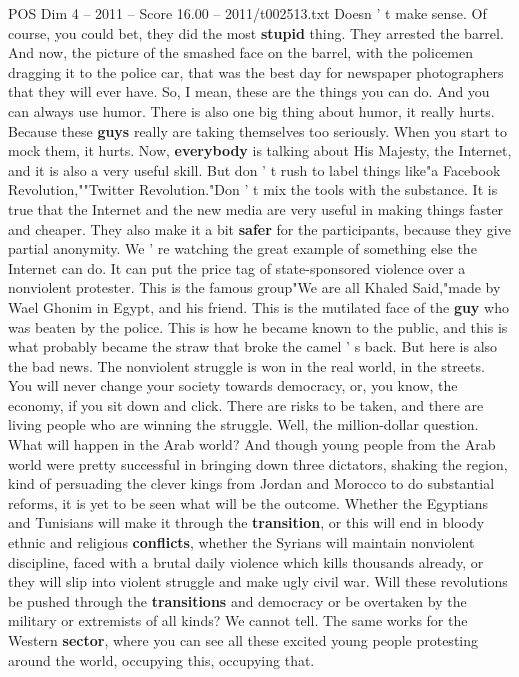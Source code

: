 \begin{textsample}{POS Dim 4 – 2011 – Score 16.00 – 2011/t002513.txt}
Doesn ' t make sense.
Of course, you could bet, they did the most \textbf{stupid} thing.
They arrested the barrel.
And now, the picture of the smashed face on the barrel, with the policemen dragging it to the police car, that was the best day for newspaper photographers that they will ever have.
So, I mean, these are the things you can do.
And you can always use humor.
There is also one big thing about humor, it really hurts.
Because these \textbf{guys} really are taking themselves too seriously.
When you start to mock them, it hurts.
Now, \textbf{everybody} is talking about His Majesty, the Internet, and it is also a very useful skill.
But don ' t rush to label things like"a Facebook Revolution,""Twitter Revolution."Don ' t mix the tools with the substance.
It is true that the Internet and the new media are very useful in making things faster and cheaper.
They also make it a bit \textbf{safer} for the participants, because they give partial anonymity.
We ' re watching the great example of something else the Internet can do.
It can put the price tag of state-sponsored violence over a nonviolent protester.
This is the famous group"We are all Khaled Said,"made by Wael Ghonim in Egypt, and his friend.
This is the mutilated face of the \textbf{guy} who was beaten by the police.
This is how he became known to the public, and this is what probably became the straw that broke the camel ' s back.
But here is also the bad news.
The nonviolent struggle is won in the real world, in the streets.
You will never change your society towards democracy, or, you know, the economy, if you sit down and click.
There are risks to be taken, and there are living people who are winning the struggle.
Well, the million-dollar question.
What will happen in the Arab world?
And though young people from the Arab world were pretty successful in bringing down three dictators, shaking the region, kind of persuading the clever kings from Jordan and Morocco to do substantial reforms, it is yet to be seen what will be the outcome.
Whether the Egyptians and Tunisians will make it through the \textbf{transition}, or this will end in bloody ethnic and religious \textbf{conflicts}, whether the Syrians will maintain nonviolent discipline, faced with a brutal daily violence which kills thousands already, or they will slip into violent struggle and make ugly civil war.
Will these revolutions be pushed through the \textbf{transitions} and democracy or be overtaken by the military or extremists of all kinds?
We cannot tell.
The same works for the Western \textbf{sector}, where you can see all these excited young people protesting around the world, occupying this, occupying that.

\end{textsample}
